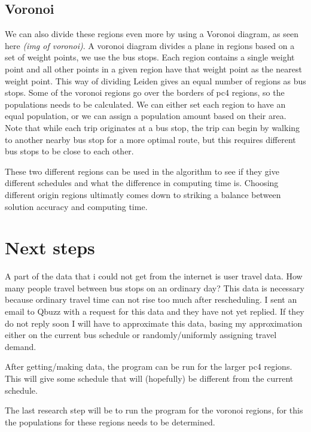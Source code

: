 \documentclass{article}
\begin{document}
\subsection{Voronoi}
We can also divide these regions even more by using a Voronoi diagram, as seen here \emph{(img of voronoi)}. A voronoi diagram divides a plane in regions based on a set of weight points, we use the bus stops. Each region contains a single weight point and all other points in a given region have that weight point as the nearest weight point. This way of dividing Leiden gives an equal number of regions as bus stops. Some of the voronoi regions go over the borders of pc4 regions, so the populations needs to be calculated. We can either set each region to have an equal population, or we can assign a population amount based on their area. Note that while each trip originates at a bus stop, the trip can begin by walking to another nearby bus stop for a more optimal route, but this requires different bus stops to be close to each other.

These two different regions can be used in the algorithm to see if they give different schedules and what the difference in computing time is. Choosing different origin regions ultimatly comes down to striking a balance between solution accuracy and computing time. 

\section{Next steps}
A part of the data that i could not get from the internet is user travel data. How many people travel between bus stops on an ordinary day? This data is necessary because ordinary travel time can not rise too much after rescheduling. I sent an email to Qbuzz with a request for this data and they have not yet replied. If they do not reply soon I will have to approximate this data, basing my approximation either on the current bus schedule or randomly/uniformly assigning travel demand.

After getting/making data, the program can be run for the larger pc4 regions. This will give some schedule that will (hopefully) be different from the current schedule.

The last research step will be to run the program for the voronoi regions, for this the populations for these regions needs to be determined.
\end{document}
